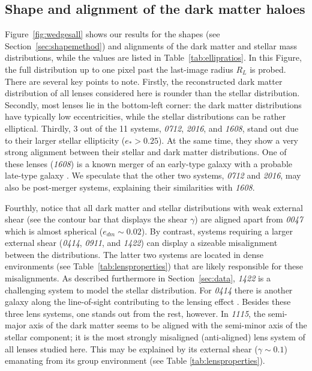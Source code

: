 \documentclass[useAMS,usenatbib]{mn2e}
\begin{document}
\subsection{Shape and alignment of the dark matter haloes}
Figure~\ref{fig:wedgesall} shows our results for the shapes (see Section~\ref{sec:shapemethod}) and alignments of the dark matter and stellar mass distributions, while the values are listed in Table~\ref{tab:ellipratios}. In this Figure, the full distribution up to one pixel past the last-image radius $R_{L}$ is probed. There are several key points to note. Firstly, the reconstructed dark matter distribution of all lenses considered here is rounder than the stellar distribution. Secondly, most lenses lie in the bottom-left corner: the dark matter distributions have typically low eccentricities, while the stellar distributions can be rather elliptical. Thirdly, 3 out of the 11 systems, {\it0712}, {\it2016}, and {\it1608}, stand out due to their larger stellar ellipticity ($e_* > 0.25$). At the same time, they show a very strong alignment between their stellar and dark matter distributions. One of these lenses ({\it1608}) is a known merger of an early-type galaxy with a probable late-type galaxy \citep{2003ApJ...584..100S}. We speculate that the other two systems, {\it0712} and {\it2016}, may also be post-merger systems, explaining their similarities with {\it1608}.

Fourthly, notice that all dark matter and stellar distributions with weak external shear (see the contour bar that displays the shear $\gamma$) are aligned apart from {\it0047} which is almost spherical ($e_{dm}\sim0.02$). By contrast, systems requiring a larger external shear ({\it0414}, {\it0911}, and {\it1422}) can display a sizeable misalignment between the distributions. The latter two systems are located in dense environments (see Table~\ref{tab:lensproperties}) that are likely responsible for these misalignments. As described furthermore in Section~\ref{sec:data}, {\it1422} is a challenging system to model the stellar distribution. For {\it0414} there is another galaxy along the line-of-sight contributing to the lensing effect \citep{2011MNRAS.413L..86C}. Besides these three lens systems, one stands out from the rest, however. In {\it1115}, the semi-major axis of the dark matter seems to be aligned with the semi-minor axis of the stellar component; it is the most strongly misaligned (anti-aligned) lens system of all lenses studied here. This may be explained by its external shear ($\gamma \sim 0.1$) emanating from its group environment (see Table \ref{tab:lensproperties}).
\end{document}
